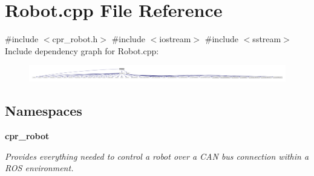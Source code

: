 \section{Robot.\+cpp File Reference}
\label{Robot_8cpp}
{\ttfamily \#include $<$cpr\+\_\+robot.\+h$>$}\newline
{\ttfamily \#include $<$iostream$>$}\newline
{\ttfamily \#include $<$sstream$>$}\newline
Include dependency graph for Robot.\+cpp\+:
\nopagebreak
\begin{figure}[H]
\begin{center}
\leavevmode
\includegraphics[width=350pt]{Robot_8cpp__incl}
\end{center}
\end{figure}
\subsection*{Namespaces}
\begin{DoxyCompactItemize}
\item 
 \textbf{ cpr\+\_\+robot}
\begin{DoxyCompactList}\small\item\em Provides everything needed to control a robot over a C\+AN bus connection within a R\+OS environment. \end{DoxyCompactList}\end{DoxyCompactItemize}
